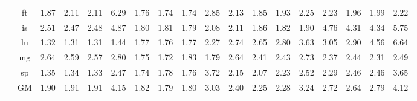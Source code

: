 \begin{table*}[]
\begin{center}
{\begin{tabular}{|c|c|rrrr|rrrr|rrrr|rrrr|}
 &  ft  &  1.87  &  2.11  &  2.11  &   6.29  &  1.76  & \cellcolor{blue!25} 1.74  &  1.74  &  2.85  &  2.13  & \cellcolor{blue!25} 1.85  &  1.93  &  2.25  &  2.23  & \cellcolor{blue!25} 1.96  &  1.99  &  2.22 \\
 &  is  &  2.51  & \cellcolor{blue!25} 2.47  &  2.48  &   4.87  &  1.80  &  1.81  & \cellcolor{blue!25} 1.79  &  2.08  &  2.11  & \cellcolor{blue!25} 1.86  & \cellcolor{blue!25} 1.82  &  1.90  &  4.76  & \cellcolor{blue!25} 4.31  &  4.34  &  5.75 \\
 &  lu  &  1.32  & \cellcolor{blue!25} 1.31  &  1.31  &   1.44  &  1.77  & \cellcolor{blue!25} 1.76  &  1.77  &  2.27  &  2.74  & \cellcolor{blue!25} 2.65  &  2.80  &  3.63  &  3.05  & \cellcolor{blue!25} 2.90  &  4.56  &  6.64 \\
 &  mg  &  2.64  & \cellcolor{blue!25} 2.59  & \cellcolor{blue!25} 2.57  &   2.80  &  1.75  & \cellcolor{blue!25} 1.72  &  1.83  &  1.79  &  2.64  & \cellcolor{blue!25} 2.41  &  2.43  &  2.73  &  2.37  &  2.44  & \cellcolor{blue!25} 2.31  &  2.49 \\
 &  sp  &  1.35  & \cellcolor{blue!25} 1.34  & \cellcolor{blue!25} 1.33  &   2.47  &  1.74  &  1.78  & \cellcolor{blue!25} 1.76  &  3.72  &  2.15  & \cellcolor{blue!25} 2.07  &  2.23  &  2.52  &  2.29  &  2.46  &  2.46  &  3.65 \\
 &  GM  &  1.90  &  1.91  &  1.91  &   4.15  &  1.82  & \cellcolor{blue!25} 1.79  &  1.80  &  3.03  &  2.40  & \cellcolor{blue!25} 2.25  &  2.28  &  3.24  &  2.72  & \cellcolor{blue!25} 2.64  &  2.79  &  4.12 \\
\hline 
\end{tabular} }

\end{center}
\end{table*}
